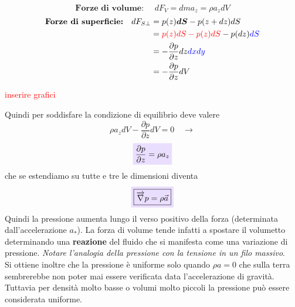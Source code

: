 \documentclass[x11names]{article}
\newcommand{\viola}[1]{\colorbox{myred}{$\displaystyle #1$}}
\begin{document}
		\begin{es}{}
		\begin{minipage}{0.5\textwidth}
		\[ 
		\textbf{Forze di volume: } \quad dF_V = dma_z = \rho a_z dV
		\]
		\begin{align*}
			\textbf{Forze di superficie:} \quad dF_{S\perp} &= p(z)\boldsymbol{dS} - p(z + dz)dS \\
														    &= \textcolor{red}{p(z)dS - p(z)dS} - p(dz)\textcolor{blue}{dS} \\
														    &= -\frac{\partial p}{\partial z}dz \textcolor{blue}{dxdy} \\
														    &=-\frac{\partial p}{\partial z} dV 
		\end{align*}
		\end{minipage}
		\begin{minipage}{0.5\textwidth}
			\begin{center}
				\textcolor{red}{inserire grafici}
			\end{center}
		\end{minipage}
		\end{es}
		\noindent
		Quindi per soddisfare la condizione di equilibrio deve valere
		\[ 
		\rho a_z dV -\frac{\partial p}{\partial z} dV  = 0 \quad \to
		\]
		\begin{equation}
			\viola{\frac{\partial p}{\partial z} = \rho a_z }
		\end{equation}
		che se estendiamo su tutte e tre le dimensioni diventa
		\begin{equation}\label{pressione}
			\viola{\boxed{\overrightarrow{\nabla} p = \rho \vec{a}}}
		\end{equation}
		Quindi la pressione aumenta lungo il verso positivo della forza (determinata dall'accelerazione \(a_*\)). La forza di volume tende infatti a spostare il volumetto determinando una \textbf{reazione} del fluido che si manifesta come una variazione di pressione. \textit{Notare l'analogia della pressione con la tensione in un filo massivo}.\\
		
		\noindent
		Si ottiene inoltre che la pressione è uniforme solo quando \(\rho a = 0\) che sulla terra sembrerebbe non poter mai essere verificata data l'accelerazione di gravità. Tuttavia per densità molto basse o volumi molto piccoli la pressione può essere considerata uniforme. \\
		
\end{document}

